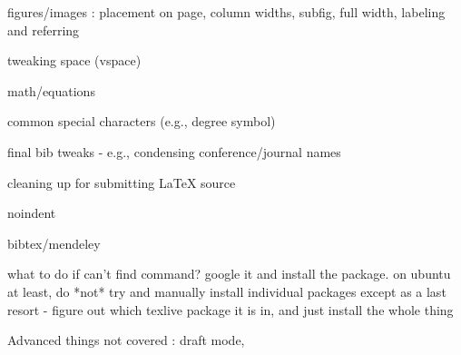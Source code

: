 \documentclass{sigchi}
\begin{document}
figures/images : placement on page, column widths, subfig, full width, labeling and referring

tweaking space (vspace)

math/equations

common special characters (e.g.,  degree symbol)

final bib tweaks - e.g., condensing conference/journal names

cleaning up for submitting LaTeX source

noindent

bibtex/mendeley

what to do if can't find command? google it and install the package. on ubuntu at least, do *not* try and manually install individual packages except as a last resort - figure out which texlive package it is in, and just install the whole thing

Advanced things not covered : draft mode, 

%
%
%
%
%
\balance{}

\balance{}



\end{document}
